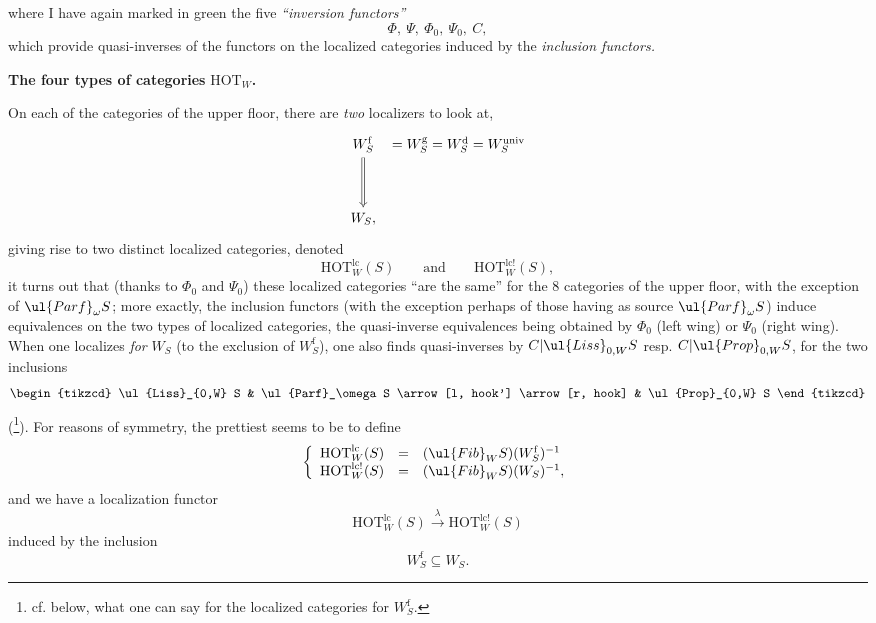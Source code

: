 

where I have again marked in green the five \textit{``inversion functors''}
\[
\Phi,\ \Psi,\ \Phi_0,\ \Psi_0,\ C,
\]
which provide quasi-inverses of the functors on the localized categories induced by the \textit{inclusion functors.}

 \textbf{The four types of categories} $\mathrm{HOT}_W$\textbf{.}

On each of the categories of the upper floor, there are \textit{two} localizers to look at, %
\[
\begin{tikzcd}[row sep=huge, column sep=0pt]
W_S^{\mathrm{f}} \arrow[d, Rightarrow] & {} = W_S^{\mathrm{g}} = W_S^{\mathrm{d}} = W_S^{\mathrm{univ}} \\
W_S, &
\end{tikzcd}
\]
giving rise to two distinct localized categories, denoted
\[
\mathrm{HOT}^{\mathrm{lc}}_W(S) \qquad \text{and} \qquad \mathrm{HOT}^{\mathrm{lc}!}_W(S),
\]
it turns out that (thanks to $\Phi_0$ and $\Psi_0$) these localized categories ``are the same'' for the 8 categories of the upper floor, with the exception of $\ul{Parf}_\omega S$; more exactly, the inclusion functors (with the exception perhaps of those having as source $\ul{Parf}_\omega S$) induce equivalences on the two types of localized categories, the quasi-inverse equivalences being obtained by $\Phi_0$ (left wing) or $\Psi_0$ (right wing). When one localizes \textit{for} $W_S$ (to the exclusion of $W_S^{\mathrm{f}}$), one also finds quasi-inverses by $C|\ul{Liss}_{0,W} S$ resp. $C|\ul{Prop}_{0,W} S$, for the two inclusions
\[
\begin{tikzcd}
\ul{Liss}_{0,W} S & \ul{Parf}_\omega S \arrow[l, hook'] \arrow[r, hook] & \ul{Prop}_{0,W} S
\end{tikzcd}
\]
(\footnote{cf. below, what one can say for the localized categories for $W_S^{\mathrm{f}}$.}). For reasons of symmetry, the prettiest seems to be to define
\[
\left\{
\begin{array}{lcl}
\mathrm{HOT}^{\mathrm{lc}}_W(S) & = & (\ul{Fib}_W S)(W_S^{\mathrm{f}})^{-1}\\
\mathrm{HOT}^{\mathrm{lc}!}_W(S) & = & (\ul{Fib}_W S)(W_S)^{-1},
\end{array}
\right.
\]
and we have a localization functor
\[
\mathrm{HOT}^{\mathrm{lc}}_W(S) \xrightarrow{\ \lambda\ } \mathrm{HOT}^{\mathrm{lc}!}_W(S)
\]
induced by the inclusion
\[
W_S^{\mathrm{f}} \subseteq W_S.
\]